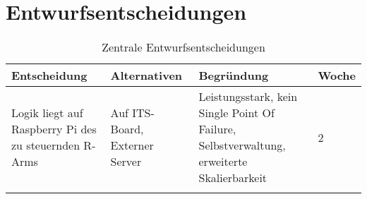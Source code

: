 \chapter{Entwurfsentscheidungen}



\begin{table}[h!]
	\centering
	\begin{tabular}{p{3cm}|p{4cm}| p{5.5cm} | p{1.5cm}|}
		\hline
		\textbf{Entscheidung} & \textbf{Alternativen} & \textbf{Begründung} & \textbf{Woche}\\
		\hline
		Logik liegt auf Raspberry Pi des zu steuernden R-Arms& Auf ITS-Board, Externer Server & Leistungsstark, kein Single Point Of Failure, Selbstverwaltung, erweiterte Skalierbarkeit & 2 \\
		\hline
		&  & & \\
		\hline
	\end{tabular}
	\caption{Zentrale Entwurfsentscheidungen}
	\label{tab:entwurfsentschiedungen}
\end{table}

